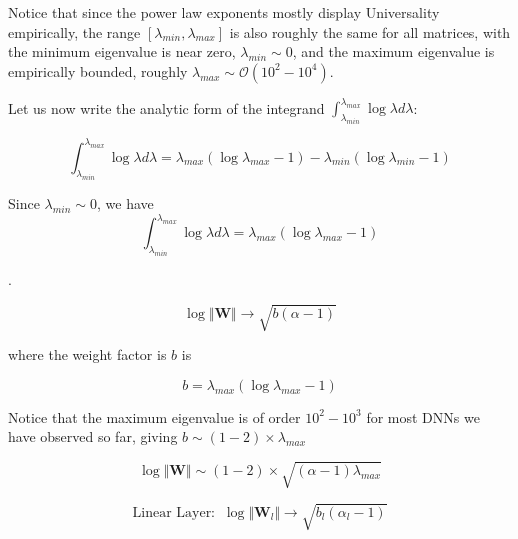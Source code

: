 Notice that since the power law exponents mostly display Universality empirically, the range $[\lambda_{min},\lambda_{max}]$ is also roughly the same for all matrices, with the minimum eigenvalue is near zero, $\lambda_{min}\sim 0$, and the maximum eigenvalue is  empirically bounded, roughly $\lambda_{max}\sim\mathcal{O}(10^{2}-10^{4})$.  

Let us now write the analytic form of the integrand $\int_{\lambda_{min}}^{\lambda_{max}}\log\lambda d\lambda$:

$$\int_{\lambda_{min}}^{\lambda_{max}}\log\lambda d\lambda=\lambda_{max}(\log \lambda_{max} - 1)-\lambda_{min}(\log \lambda_{min} - 1)$$

Since $\lambda_{min}\sim 0$, we have
$$\int_{\lambda_{min}}^{\lambda_{max}}\log\lambda d\lambda=\lambda_{max}(\log \lambda_{max} - 1)$$






.  

$$\log\Vert\mathbf{W}\Vert\rightarrow \sqrt{b(\alpha-1)}$$

where the weight factor is $b$ is 

$$b=\lambda_{max}(\log \lambda_{max} - 1)$$

Notice that the maximum eigenvalue is of order $10^{2}-10^{3}$ for  most DNNs we have observed so far, giving $b\sim(1-2)\times\lambda_{max}$

$$\log\Vert\mathbf{W}\Vert\sim(1-2)\times\sqrt{(\alpha-1)\lambda_{max}}$$



$$\text{Linear Layer:}\;\;\log\Vert\mathbf{W}_{l}\Vert\rightarrow\sqrt{b_{l}(\alpha_{l}-1)}$$

